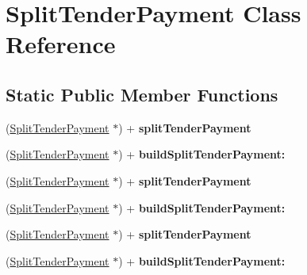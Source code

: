 \hypertarget{interface_split_tender_payment}{
\section{SplitTenderPayment Class Reference}
\label{interface_split_tender_payment}
}
\subsection*{Static Public Member Functions}
\begin{DoxyCompactItemize}
\item 
\hypertarget{interface_split_tender_payment_ada783170bf3b881be4dc99b2cb09e837}{
(\hyperlink{interface_split_tender_payment}{SplitTenderPayment} $\ast$) + {\bfseries splitTenderPayment}}
\label{interface_split_tender_payment_ada783170bf3b881be4dc99b2cb09e837}

\item 
\hypertarget{interface_split_tender_payment_ae8f56f63bebc1f550bffc539e56c4744}{
(\hyperlink{interface_split_tender_payment}{SplitTenderPayment} $\ast$) + {\bfseries buildSplitTenderPayment:}}
\label{interface_split_tender_payment_ae8f56f63bebc1f550bffc539e56c4744}

\item 
\hypertarget{interface_split_tender_payment_ada783170bf3b881be4dc99b2cb09e837}{
(\hyperlink{interface_split_tender_payment}{SplitTenderPayment} $\ast$) + {\bfseries splitTenderPayment}}
\label{interface_split_tender_payment_ada783170bf3b881be4dc99b2cb09e837}

\item 
\hypertarget{interface_split_tender_payment_ae8f56f63bebc1f550bffc539e56c4744}{
(\hyperlink{interface_split_tender_payment}{SplitTenderPayment} $\ast$) + {\bfseries buildSplitTenderPayment:}}
\label{interface_split_tender_payment_ae8f56f63bebc1f550bffc539e56c4744}

\item 
\hypertarget{interface_split_tender_payment_ada783170bf3b881be4dc99b2cb09e837}{
(\hyperlink{interface_split_tender_payment}{SplitTenderPayment} $\ast$) + {\bfseries splitTenderPayment}}
\label{interface_split_tender_payment_ada783170bf3b881be4dc99b2cb09e837}

\item 
\hypertarget{interface_split_tender_payment_ae8f56f63bebc1f550bffc539e56c4744}{
(\hyperlink{interface_split_tender_payment}{SplitTenderPayment} $\ast$) + {\bfseries buildSplitTenderPayment:}}
\label{interface_split_tender_payment_ae8f56f63bebc1f550bffc539e56c4744}

\end{DoxyCompactItemize}

